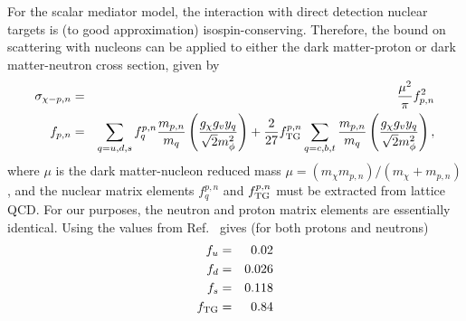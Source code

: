 For the scalar mediator model, the interaction with direct detection nuclear targets is (to good approximation) isospin-conserving. Therefore, the bound on scattering with nucleons can be applied to either the dark matter-proton or dark matter-neutron cross section, given by
\begin{eqnarray}
\sigma_{\chi-p,n} & = & \frac{\mu^2}{\pi} f_{p,n}^2 \\
f_{p,n} & = & \sum_{q=u,d,s} f^{p,n}_q \frac{m_{p,n}}{m_q} \left(\frac{g_\chi g_v y_q}{\sqrt{2}m_\phi^2} \right) + \frac{2}{27} f_{\rm TG}^{p,n} \sum_{q=c,b,t} \frac{m_{p,n}}{m_q} \left(\frac{g_\chi g_v y_q}{\sqrt{2}m_\phi^2} \right),
\end{eqnarray}
where $\mu$ is the dark matter-nucleon reduced mass $\mu = (m_\chi m_{p,n})/(m_\chi + m_{p,n})$, and the nuclear matrix elements $f_{q}^{p,n}$ and $f_{\rm TG}^{p,n}$ must be extracted from lattice QCD. For our purposes, the neutron and proton matrix elements are essentially identical. Using the values from Ref.~\cite{1003.0014} gives (for both protons and neutrons)
\begin{eqnarray}
f_u & = & 0.02 \\
f_d & = & 0.026 \\
f_s & = & 0.118 \\
f_{\rm TG} & = & 0.84
\end{eqnarray}

